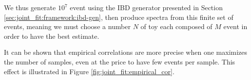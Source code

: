 \documentclass[../main.tex]{subfiles}
\begin{document}
We thus generate $10^7$ event using the IBD generator presented in Section \ref{sec:joint_fit:framework:ibd-gen}, then produce spectra from this finite set of events, meaning we must choose a number $N$ of toy each composed of $M$ event in order to have the best estimate.

It can be shown that empirical correlations are more precise when one maximizes the number of samples, even at the price to have few events per sample. This effect is illustrated in Figure \ref{fig:joint_fit:empirical_cor}.

%
\end{document}
